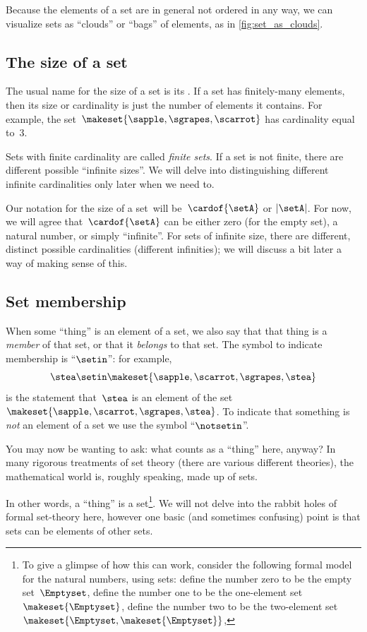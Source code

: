 Because the elements of a set are in general not ordered in any way, we can visualize sets as ``clouds'' or ``bags'' of elements, as in \cref{fig:set_as_clouds}.

\subsection{The size of a set}
\label{sec:cardinality}
The usual name for the size of a set is its .
If a set has finitely-many elements, then its size or cardinality is just the number of elements it contains.
For example, the set~$\makeset{ \sapple, \sgrapes, \scarrot }$ has cardinality equal to~$3$.

Sets with finite cardinality are called \emph{finite sets}.
If a set is not finite, there are different possible ``infinite sizes''.
We will delve into distinguishing different infinite cardinalities only later when we need to.

Our notation for the size of a set~\setA will be~$\cardof{\setA}$ or $\vert \setA \vert$.
For now, we will agree that~$\cardof{\setA}$ can be either zero (for the empty set), a natural number, or simply ``infinite''.
For sets of infinite size, there are different, distinct possible cardinalities (different infinities); we will discuss a bit later a way of making sense of this.

\subsection{Set membership}
\label{sec:set-membership}
When some ``thing'' is an element of a set, we also say that that thing is a \emph{member} of that set, or that it \emph{belongs} to that set.
The symbol to indicate membership is ``$\setin$'': for example,
\begin{equation}
    \stea \setin\makeset{ \sapple, \scarrot, \sgrapes, \stea }
\end{equation}
is the statement that~$\stea$ is an element of the set~$\makeset{ \sapple, \scarrot, \sgrapes, \stea }$.
To indicate that something is \emph{not} an element of a set we use the symbol ``$\notsetin$''.

You may now be wanting to ask: what counts as a ``thing'' here, anyway?
In many rigorous treatments of set theory (there are various different theories), the mathematical world is, roughly speaking, made up of sets.

In other words, a ``thing'' is a set\footnote{
    To give a glimpse of how this can work, consider the following formal model for the natural numbers, using sets: define the number zero to be the empty set~$\Emptyset$, define the number one to be the one-element set~$\makeset{ \Emptyset }$, define the number two to be the two-element set~$\makeset{ \Emptyset, \makeset{ \Emptyset } }$, \etc }.
We will not delve into the rabbit holes of formal set-theory here, however one basic (and sometimes confusing) point is that sets can be elements of other sets.

